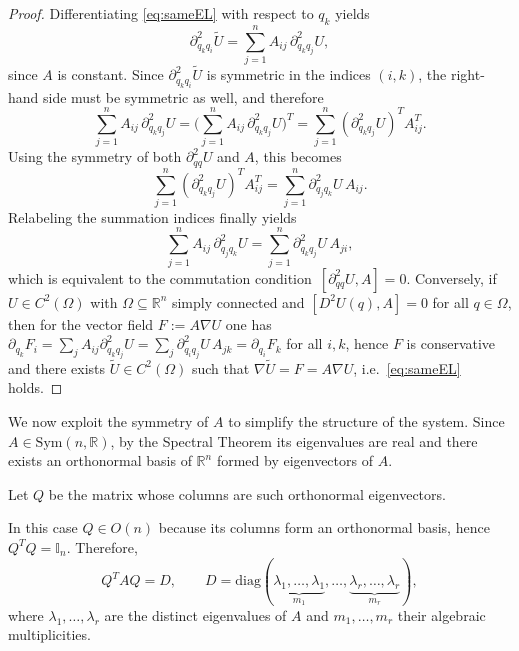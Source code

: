\documentclass{rendiconti}
\begin{document}
%
\begin{proof}
Differentiating \eqref{eq:sameEL} with respect to $q_k$ yields
\begin{equation}
\textstyle
\partial^2_{q_k q_i} \widetilde U
=
\sum_{j=1}^n A_{ij}\, \partial^2_{q_k q_j} U,
\end{equation}
since $A$ is constant.
Since $\partial^2_{q_k q_i} \widetilde U$ is symmetric in the indices $(i,k)$,
the right-hand side must be symmetric as well, and therefore
\begin{equation}
\textstyle
\sum_{j=1}^n A_{ij}\, \partial^2_{q_k q_j} U
=
\big(\sum_{j=1}^n A_{ij}\, \partial^2_{q_k q_j} U\big)^T
=
\sum_{j=1}^n (\partial^2_{q_k q_j} U)^T A_{ij}^T.
\end{equation}
Using the symmetry of both $\partial^2_{qq}U$ and $A$, this becomes
\begin{equation}
\textstyle
\sum_{j=1}^n (\partial^2_{q_k q_j} U)^T A_{ij}^T
=
\sum_{j=1}^n \partial^2_{q_j q_k} U\, A_{ij}.
\end{equation}
Relabeling the summation indices finally yields
\begin{equation}
\textstyle
\sum_{j=1}^n A_{ij}\, \partial^2_{q_j q_k} U
=
\sum_{j=1}^n \partial^2_{q_k q_j} U\, A_{ji},
\end{equation}
which is equivalent to the commutation condition
$\,[\partial^2_{qq}U, A]=0$.
Conversely, if $U\in C^2(\Omega)$ with $\Omega\subseteq\mathbb{R}^n$ simply connected and $[D^2U(q),A]=0$ for all $q\in\Omega$, then for the vector field $F:=A\nabla U$ one has $\partial_{q_k}F_i=\sum_{j}A_{ij}\partial^2_{q_k q_j}U=\sum_{j}\partial^2_{q_i q_j}U\,A_{jk}=\partial_{q_i}F_k$ for all $i,k$, hence $F$ is conservative and there exists $\widetilde U\in C^2(\Omega)$ such that $\nabla\widetilde U=F=A\nabla U$, i.e.\ \eqref{eq:sameEL} holds.
\end{proof}
%
We now exploit the symmetry of $A$ to simplify the structure of the system.
Since $A \in \mathrm{Sym}(n,\mathbb{R})$, by the Spectral Theorem its eigenvalues
are real and there exists an orthonormal basis of $\mathbb{R}^n$ formed by
eigenvectors of $A$.

Let $Q$ be the matrix whose columns are such orthonormal eigenvectors.

\begin{remark}
In this case $Q \in O(n)$ because its columns form an
orthonormal basis, hence $Q^T Q=\mathbb I_n$.
Therefore,
\begin{equation}
\label{eq:diag}
Q^T A Q = D,
\qquad
D = \mathrm{diag}
(\underbrace{\lambda_1,\dots,\lambda_1}_{m_1},\dots,
\underbrace{\lambda_r,\dots,\lambda_r}_{m_r}),
\end{equation}
where $\lambda_1,\dots,\lambda_r$ are the distinct eigenvalues of $A$
and $m_1,\dots,m_r$ their algebraic multiplicities.
\end{remark}
\end{document}
